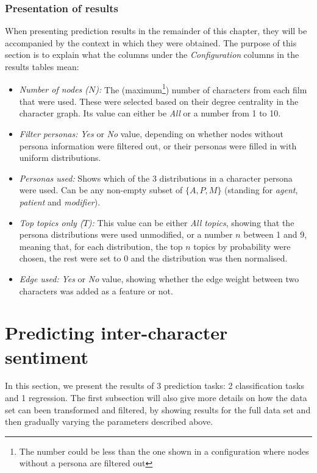 \documentclass[bsc,frontabs,singlespacing,parskip, twoside]{infthesis}
\begin{document}
\subsubsection{Presentation of results}
When presenting prediction results in the remainder of this chapter, they will be accompanied by the context in which they were obtained. The purpose of this section is to explain what the columns under the \textit{Configuration} columns in the results tables mean:
\begin{itemize}
	\item \textit{Number of nodes ($N$):} The (maximum\footnote{The number could be less than the one shown in a configuration where nodes without a persona are filtered out}) number of characters from each film that were used. These were selected based on their degree centrality in the character graph. Its value can either be \textit{All} or a number from 1 to 10.
	\item \textit{Filter personas:} \textit{Yes} or \textit{No} value, depending on whether nodes without persona information were filtered out, or their personas were filled in with uniform distributions.
	\item \textit{Personas used:} Shows which of the 3 distributions in a character persona were used. Can be any non-empty subset of $\{A, P, M\}$ (standing for \textit{agent}, \textit{patient} and \textit{modifier}).
	\item \textit{Top topics only ($T$):} This value can be either \textit{All topics}, showing that the persona distributions were used unmodified, or a number $n$ between 1 and 9, meaning that, for each distribution, the top $n$ topics by probability were chosen, the rest were set to 0 and the distribution was then normalised.
	\item \textit{Edge used:} \textit{Yes} or \textit{No} value, showing whether the edge weight between two characters was added as a feature or not.
\end{itemize}

\section{Predicting inter-character sentiment}

In this section, we present the results of 3 prediction tasks: 2 classification tasks and 1 regression. The first subsection will also give more details on how the data set can been transformed and filtered, by showing results for the full data set and then gradually varying the parameters described above.
\end{document}
